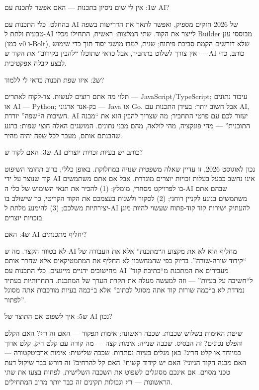 
ש1: אין לי שום ניסיון בתכנות — האם אפשר לתכנת עם AI?

בהחלט. כלי התכנות עם AI של 2026 חזקים מספיק, ואפשר לתאר את הדרישות בשפה טבעית ולתת ל-AI לייצר את הקוד. שתי המלצות: ראשית, התחילו מכלי Builder מבוססי ענן (כמו v0 ו-Bolt), שלא דורשים הקמת סביבת פיתוח; שנית, למדו מושגי יסוד תוך כדי שימוש — אין צורך לשלוט בתחביר, אבל כדאי שתוכלו “להבין בקירוב” את הקוד ש-AI כותב, כדי לבצע קבלה אפקטיבית.

ש2: איזו שפת תכנות כדאי לי ללמוד?

תלוי מה אתם רוצים לעשות. צד-לקוח לאתרים — JavaScript/TypeScript; עיבוד נתונים או AI — Python; בק-אנד ארגוני — Java או Go. אבל חשוב יותר: בעידן התכנות עם AI, חשיבות ה“שפה” יורדת. AI יעזור לכם עם פרטי התחביר; מה שצריך להבין הוא את “מבנה התוכנית” — מהי פונקציה, מהי לולאה, מהם מבני נתונים. המושגים האלה חוצי שפות: ברגע שהבנתם אותם, מעבר לכל שפה יהיה מהיר.

ש3: האם לקוד ש-AI כותב יש בעיות זכויות יוצרים?

נכון לאוגוסט 2026, זו עדיין שאלה משפטית שנויה במחלוקת. באופן כללי, ברוב תחומי השיפוט קוד שנוצר על ידי AI אינו נחשב כבעל בעלות זכויות יוצרים מוגדרת. אבל אם אתם משתמשים בו לפרויקט מסחרי, מומלץ: (1) להכיר את תנאי השימוש של כלי ה-AI שבהם אתם משתמשים בנוגע לקניין רוחני; (2) לסקור ולשנות בעצמכם את הקוד הקריטי, כך שישולב בו יצירתיות משלכם; (3) להימנע מלתת ל-AI להעתיק ישירות קוד קוד-פתוח שעשוי להיות מוגן בזכויות יוצרים.

ש4: האם AI יחליף מתכנתים?

לא בטווח הקצר. מה ש-AI מחליף הוא לא את מקצוע ה“מתכנת” אלא את העבודה של “קידוד שורה-שורה”. בדיוק כפי שהמחשבון לא החליף את המתמטיקאים אלא שחרר אותם מחישובים ידניים מייגעים. כלי התכנות עם AI מעבירים את המתכנת מ“כתיבת קוד” ל“חשיבה על בעיות” — וזה למעשה מעלה את תקרת הערך של המתכנת. התחרותיות בעתיד נמדדת לא ב“כמה שורות קוד אתה מסוגל לכתוב” אלא ב“כמה בעיות מורכבות אתה מסוגל לפתור”.

ש5: איך לשפוט אם התוצר של AI נכון?

שיטת האימות בשלוש שכבות. שכבה ראשונה: אימות תפקוד — האם זה רץ? האם הקלט והפלט נכונים? זה הבסיס. שכבה שנייה: אימות קצה — מה קורה עם קלט ריק, קלט ארוך במיוחד או קלט חריג? כאן מגלים בעיות נסתרות. שכבה שלישית: אימות ארכיטקטורה — האם מבנה הקוד הגיוני? האם יש קידוד קשיח? האם קל להרחיב? זה דורש כבר שיקול דעת טכני מסוים. אם אינכם מסוגלים לשפוט את השכבה השלישית, לפחות בצעו את שתי הראשונות — רץ וגבולות תקינים זה כבר יותר מרוב המתחילים.


